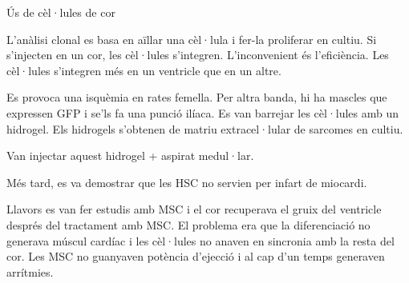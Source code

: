 Ús de cèl·lules de cor

L'anàlisi clonal es basa en aïllar una cèl·lula i fer-la proliferar en cultiu. Si s'injecten en un cor, les cèl·lules s'integren. L'inconvenient és l'eficiència. Les cèl·lules s'integren més en un ventricle que en un altre.

Es provoca una isquèmia en rates femella. Per altra banda, hi ha mascles que expressen GFP i se'ls fa una punció ilíaca. Es van barrejar les cèl·lules amb un hidrogel. Els hidrogels s'obtenen de matriu extracel·lular de sarcomes en cultiu.

Van injectar aquest hidrogel + aspirat medul·lar.  %

Més tard, es va demostrar que les HSC no servien per infart de miocardi.

Llavors es van fer estudis amb MSC i el cor recuperava el gruix del ventricle després del tractament amb MSC. El problema era que la diferenciació no generava múscul cardíac i les cèl·lules no anaven en sincronia amb la resta del cor. Les MSC no guanyaven potència d'ejecció i al cap d'un temps generaven arrítmies.